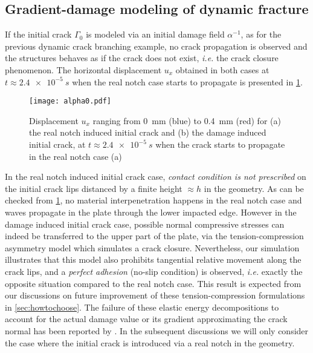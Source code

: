 \subsection{Gradient-damage modeling of dynamic fracture}
If the initial crack $\Gamma_0$ is modeled via an initial damage field $\alpha^{-1}$, as for the previous dynamic crack branching example, no crack propagation is observed and the structures behaves as if the crack does not exist, \emph{i.e.} the crack closure phenomenon. The horizontal displacement $u_x$ obtained in both cases at $t\approx\SI{2.4e-5}{s}$ when the real notch case starts to propagate is presented in \cref{fig:alpha0}.
\begin{figure}[htbp]
\centering
\texttt{[image: alpha0.pdf]}
\caption{Displacement $u_x$ ranging from \SI{0}{mm} (blue) to \SI{0.4}{mm} (red) for (a) the real notch induced initial crack and (b) the damage induced initial crack, at $t\approx\SI{2.4e-5}{s}$ when the crack starts to propagate in the real notch case (a)} \label{fig:alpha0}
\end{figure}
In the real notch induced initial crack case, \emph{contact condition is not prescribed} on the initial crack lips distanced by a finite height $\approx h$ in the geometry. As can be checked from \cref{fig:alpha0}, no material interpenetration happens in the real notch case and waves propagate in the plate through the lower impacted edge. However in the damage induced initial crack case, possible normal compressive stresses can indeed be transferred to the upper part of the plate, via the tension-compression asymmetry model \cite{FreddiRoyer-Carfagni:2010} which simulates a crack closure. Nevertheless, our simulation illustrates that this model also prohibits tangential relative movement along the crack lips, and a \emph{perfect adhesion} (no-slip condition) is observed, \emph{i.e.} exactly the opposite situation compared to the real notch case. This result is expected from our discussions on future improvement of these tension-compression formulations in \cref{sec:howtochoose}. The failure of these elastic energy decompositions to account for the actual damage value or its gradient approximating the crack normal has been reported by \cite{MayVignolletBorst:2015}. In the subsequent discussions we will only consider the case where the initial crack is introduced via a real notch in the geometry.

